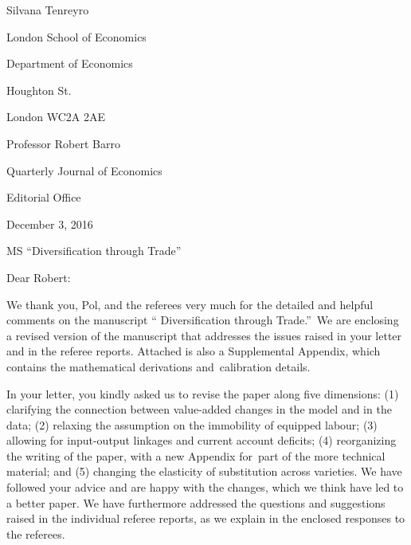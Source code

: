 \documentclass[12pt]{article}
\begin{document}
\begin{letterfromaddr}
Silvana Tenreyro

London School of Economics

Department of Economics

Houghton St.

London WC2A 2AE

\bigskip
\end{letterfromaddr}

\begin{letterto}
Professor Robert Barro
\end{letterto}

\begin{lettertoaddr}
Quarterly Journal of Economics

Editorial Office
\end{lettertoaddr}

\begin{letterdate}
December 3, 2016\bigskip
\end{letterdate}

\begin{lettersubj}
MS \textquotedblleft Diversification through Trade\textquotedblright \bigskip
\end{lettersubj}

\begin{letteropening}
Dear Robert:
\end{letteropening}

We thank you, Pol, and the referees very much for the
detailed and helpful comments on the manuscript \textquotedblleft
Diversification through Trade.\textquotedblright\ We are enclosing a revised
version of the manuscript that addresses the issues raised in your letter
and in the referee reports. Attached is also a Supplemental Appendix, which
contains the mathematical derivations and\ calibration details.

In your letter, you kindly asked us to revise the paper along five
dimensions: (1) clarifying the connection between value-added changes in the
model and in the data; (2) relaxing the assumption on the immobility of
equipped labour; (3) allowing for input-output linkages and current account
deficits; (4) reorganizing the writing of the paper, with a new Appendix
for\ part of the more technical material; and (5) changing the elasticity of
substitution across varieties. We have followed your advice and are happy
with the changes, which we think have led to a better paper. We have
furthermore addressed the questions and suggestions raised in the individual
referee reports, as we explain in the enclosed responses to the referees.
\end{document}
